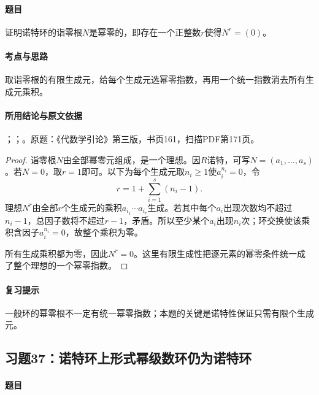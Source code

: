 \paragraph{题目}

证明诺特环的诣零根$N$是幂零的，即存在一个正整数$r$使得$N^r=(0)$。

\paragraph{考点与思路}

取诣零根的有限生成元，给每个生成元选幂零指数，再用一个统一指数消去所有生成元乘积。

\paragraph{所用结论与原文依据}

；；。原题：《代数学引论》第三版，书页161，扫描PDF第171页。


\begin{proof}

诣零根$N$由全部幂零元组成，是一个理想。因$R$诺特，可写$N=(a_1,\ldots,a_s)$。若$N=0$，取$r=1$即可。以下为每个生成元取$n_i\ge1$使$a_i^{n_i}=0$，令
\[
r=1+\sum_{i=1}^s(n_i-1).
\]
理想$N^r$由全部$r$个生成元的乘积$a_{i_1}\cdots a_{i_r}$生成。若其中每个$a_i$出现次数均不超过$n_i-1$，总因子数将不超过$r-1$，矛盾。所以至少某个$a_i$出现$n_i$次；环交换使该乘积含因子$a_i^{n_i}=0$，故整个乘积为零。

所有生成乘积都为零，因此$N^r=0$。这里有限生成性把逐元素的幂零条件统一成了整个理想的一个幂零指数。

\end{proof}

\paragraph{复习提示}

一般环的幂零根不一定有统一幂零指数；本题的关键是诺特性保证只需有限个生成元。

\subsection{习题37：诺特环上形式幂级数环仍为诺特环}

\label{ex:4:37}

\paragraph{题目}

